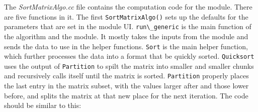 \documentclass[fleqn,11pt,openany]{book}
\begin{document}
The \emph{SortMatrixAlgo.cc} file contains the computation code for the module.
There are five functions in it.
The first \verb|SortMatrixAlgo()| sets up the defaults for the parameters that are set in the module UI.
\verb|run\_generic| is the main function of the algorithm and the module.  
It mostly takes the inputs from the module and sends the data to use in the helper functions.
\verb|Sort| is the main helper function, which further processes the data into a format that be quickly sorted.  
\verb|Quicksort| uses the output of \verb|Partition| to spilt the matrix into smaller and smaller chunks and recursively calls itself until the matrix is sorted.
\verb|Partition| properly places the last entry in the matrix subset, with the values larger after and those lower before, and splits the matrix at that new place for the next iteration.  
The code should be similar to this:
\end{document}
